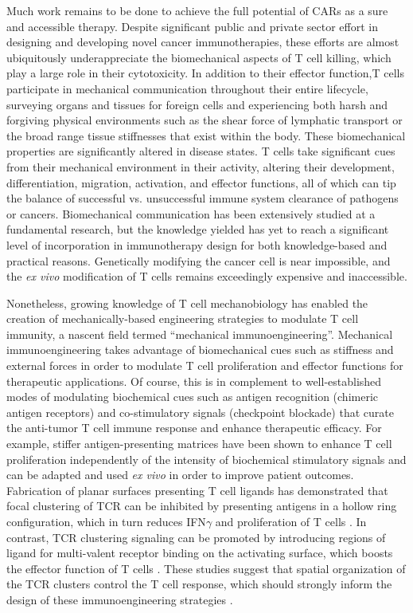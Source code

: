 Much work remains to be done to achieve the full potential of CARs as a sure and accessible therapy. Despite significant public and private sector effort in designing and developing novel cancer immunotherapies, these efforts are almost ubiquitously underappreciate the biomechanical aspects of T cell killing, which play a large role in their cytotoxicity. In addition to their effector function,T cells participate in mechanical communication throughout their entire lifecycle, surveying organs and tissues for foreign cells and experiencing both harsh and forgiving physical environments such as the shear force of lymphatic transport or the broad range tissue stiffnesses that exist within the body. These biomechanical properties are significantly altered in disease states. T cells take significant cues from their mechanical environment in their activity, altering their development, differentiation, migration, activation, and effector functions, all of which can tip the balance of successful vs. unsuccessful immune system clearance of pathogens or cancers. Biomechanical communication has been extensively studied at a fundamental research, but the knowledge yielded has yet to reach a significant level of incorporation in immunotherapy design for both knowledge-based and practical reasons. Genetically modifying the cancer cell is near impossible, and the \textit{ex vivo} modification of T cells remains exceedingly expensive and inaccessible. 

Nonetheless, growing knowledge of T cell mechanobiology has enabled the  creation of mechanically-based engineering strategies to modulate T cell immunity, a nascent field termed “mechanical immunoengineering”. Mechanical immunoengineering takes advantage of biomechanical cues such as stiffness and external forces in order to modulate T cell proliferation and effector functions for therapeutic applications. Of course, this is in complement to well-established modes of modulating biochemical cues such as antigen recognition (chimeric antigen receptors) and co-stimulatory signals (checkpoint blockade) that curate the anti-tumor T cell immune response and enhance therapeutic efficacy. For example, stiffer antigen-presenting matrices have been shown to enhance T cell proliferation independently of the intensity of biochemical stimulatory signals \cite{Lei2020} and can be adapted and used \textit{ex vivo} in order to improve patient outcomes. Fabrication of planar surfaces presenting T cell ligands has demonstrated that focal clustering of TCR can be inhibited by presenting antigens in a hollow ring configuration, which in turn reduces IFN$\gamma$ and proliferation of T cells \cite{Schraml2015}. In contrast, TCR clustering signaling can be promoted by introducing regions of ligand for multi-valent receptor binding on the activating surface, which boosts the effector function of T cells \cite{OConnor2012, Schraml2015}.  These studies suggest that spatial organization of the TCR clusters control the T cell response,  which should strongly inform the design of these immunoengineering strategies \cite{Aramesh2019}.


